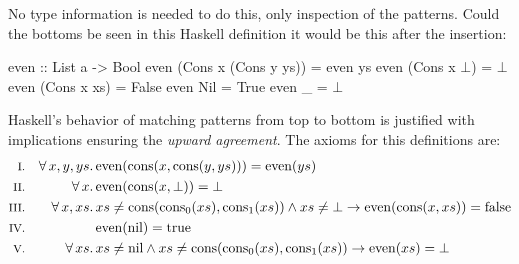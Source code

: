 \begin{comment}
First, it needs to be determined if there is a match-anything branch or not.
For \hs{even} above, there is no match anything case, so a new one is added
that matches anything that is not

For each matched constructor, we need to add a new match to bottom,
which evaluates to bottom. Unnecessary bottoms can be carelessly added
since overlapping patterns are removed \emph{afterwards}. Furthermore,
a wild pattern is added at the end that goes to bottom in case there
are other constructors for the data type not mentioned in the
patterns.
\end{comment}

No type information is needed to do this, only inspection of the
patterns. Could the bottoms be seen in this Haskell definition it
would be this after the insertion:

\begin{code}[mathescape]
even :: List a -> Bool
even (Cons x (Cons y ys)) = even ys
even (Cons x $\bot$)            = $\bot$
even (Cons x xs)          = False
even Nil                  = True
even _                    = $\bot$
\end{code}

Haskell's behavior of matching patterns from top to bottom is
justified with implications ensuring the \emph{upward agreement}. The
axioms for this definitions are:
\newcommand\uncons[1]{\cons{\fn{cons_0}(#1)}{\fn{cons_1}(#1)}}
\newcommand\even[1]{\fn{even}(#1)}
\newcommand\cons[2]{\fn{cons}(#1,#2)}
\begin{align*}
\rom{1} && \faaa{x}{y}{ys} & \even{\cons{x}{\cons{y}{ys}}} = \even{ys} \\
\rom{2} && \fa{x}          & \even{\cons{x}{\bot}}         = \bot      \\
\rom{3} && \faa{x}{xs}     & xs \neq \uncons{xs} \wedge xs \neq \bot \rightarrow \even{\cons{x}{xs}} = \fn{false}  \\
\rom{4} &&                 & \even{\fn{nil}} = \fn{true} \\
\rom{5} && \fa{xs}         & xs \neq \fn{nil} \wedge
                             xs \neq \uncons{xs}
                             \rightarrow \even{xs} = \bot
\end{align*}

\begin{comment}
Some room for improvement can be seen: the inserted
\hs{even }$\bot$\hs{ = }$\bot$ case is redundant as it is implied by
the wild pattern to $\bot$.
\end{comment}

